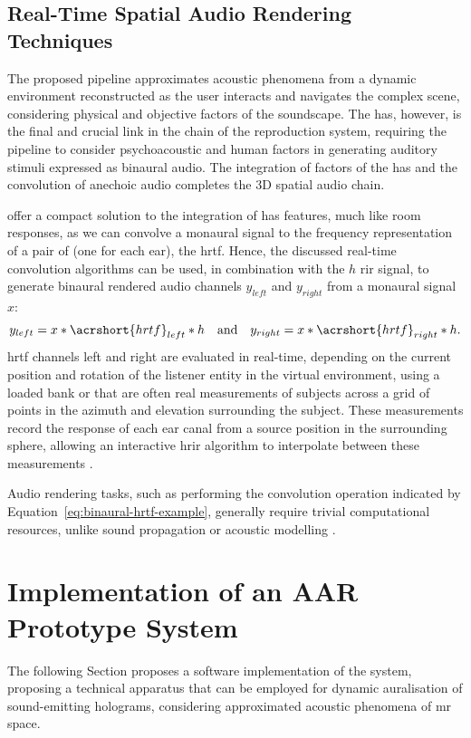 \subsection{Real-Time Spatial Audio Rendering Techniques}
The proposed pipeline approximates acoustic phenomena from a dynamic environment reconstructed as the user interacts and navigates the complex scene, considering physical and objective factors of the soundscape. The \acrshort{has}, however, is the final and crucial link in the chain of the reproduction system, requiring the pipeline to consider psychoacoustic and human factors in generating auditory stimuli expressed as binaural audio. The integration of factors of the \acrshort{has} and the convolution of anechoic audio completes the 3D spatial audio chain.\par
{} offer a compact solution to the integration of \acrshort{has} features, much like room responses, as we can convolve a monaural signal to the frequency representation of a pair of  (one for each ear), the \acrfull{hrtf}. Hence, the discussed real-time convolution algorithms \citep{kim2019immersive} can be used, in combination with the $h$ \acrshort{rir} signal, to generate binaural rendered audio channels $y_{left}$ and $y_{right}$ from a monaural signal $x$:
\begin{equation}\label{eq:binaural-hrtf-example}
    y_{left} = x * \acrshort{hrtf}_{left} * h \quad \textrm{and} \quad  y_{right} = x * \acrshort{hrtf}_{right} * h \textrm{.}
\end{equation}
\acrshort{hrtf} channels left and right are evaluated in real-time, depending on the current position and rotation of the listener entity in the virtual environment, using a loaded bank or  that are often real measurements of subjects across a grid of points in the azimuth and elevation surrounding the subject. These measurements record the response of each ear canal from a source position in the surrounding sphere, allowing an interactive \acrshort{hrir} algorithm to interpolate between these measurements \citep{hoene2017mysofa}.\par
Audio rendering tasks, such as performing the convolution operation indicated by Equation~\ref{eq:binaural-hrtf-example}, generally require trivial computational resources, unlike sound propagation or acoustic modelling \citep{liu2020sound}. 

\section{Implementation of an AAR Prototype System}
The following Section proposes a software implementation of the system, proposing a technical apparatus that can be employed for dynamic auralisation of sound-emitting holograms, considering approximated acoustic phenomena of \acrshort{mr} space.

